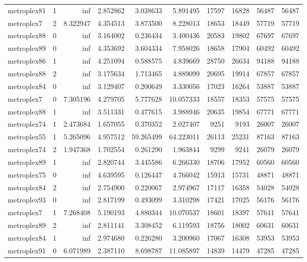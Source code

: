 \begin{longtable}{|l|r|r|r|r|r|r|r|r|r|}
metroplex81 & 1 & inf & 2.852862 & 3.038633 & 5.891495 & 17597 & 16828 & 56487 & 56487 \\
metroplex7 & 2 & 8.322947 & 4.354513 & 3.873500 & 8.228013 & 18653 & 18449 & 57719 & 57719 \\
metroplex88 & 0 & inf & 3.164002 & 0.236434 & 3.400436 & 20583 & 19802 & 67697 & 67697 \\
metroplex89 & 0 & inf & 4.353692 & 3.604334 & 7.958026 & 18658 & 17904 & 60492 & 60492 \\
metroplex86 & 1 & inf & 4.251094 & 0.588575 & 4.839669 & 28750 & 26634 & 94188 & 94188 \\
metroplex88 & 2 & inf & 3.175634 & 1.713465 & 4.889099 & 20695 & 19914 & 67857 & 67857 \\
metroplex84 & 0 & inf & 3.129407 & 0.200649 & 3.330056 & 17023 & 16264 & 53887 & 53887 \\
metroplex7 & 0 & 7.305196 & 4.279705 & 5.777628 & 10.057333 & 18557 & 18353 & 57575 & 57575 \\
metroplex88 & 1 & inf & 3.511331 & 0.477615 & 3.988946 & 20635 & 19854 & 67771 & 67771 \\
metroplex74 & 1 & 2.473684 & 1.657055 & 0.370352 & 2.027407 & 9251 & 9193 & 26007 & 26007 \\
metroplex55 & 1 & 5.265096 & 4.957512 & 59.265499 & 64.223011 & 26113 & 25231 & 87163 & 87163 \\
metroplex74 & 2 & 1.947368 & 1.702554 & 0.261290 & 1.963844 & 9299 & 9241 & 26079 & 26079 \\
metroplex89 & 1 & inf & 2.820744 & 3.445586 & 6.266330 & 18706 & 17952 & 60560 & 60560 \\
metroplex75 & 0 & inf & 4.639595 & 0.126447 & 4.766042 & 15913 & 15731 & 48871 & 48871 \\
metroplex84 & 2 & inf & 2.754900 & 0.220067 & 2.974967 & 17117 & 16358 & 54028 & 54028 \\
metroplex93 & 0 & inf & 2.817199 & 0.493099 & 3.310298 & 17421 & 17025 & 56176 & 56176 \\
metroplex7 & 1 & 7.268408 & 5.190193 & 4.880344 & 10.070537 & 18601 & 18397 & 57641 & 57641 \\
metroplex89 & 2 & inf & 2.811141 & 3.308452 & 6.119593 & 18756 & 18002 & 60631 & 60631 \\
metroplex84 & 1 & inf & 2.974680 & 0.226280 & 3.200960 & 17067 & 16308 & 53953 & 53953 \\
metroplex91 & 0 & 6.071989 & 2.387110 & 8.698787 & 11.085897 & 14839 & 14479 & 47285 & 47285 \\

\end{longtable}
